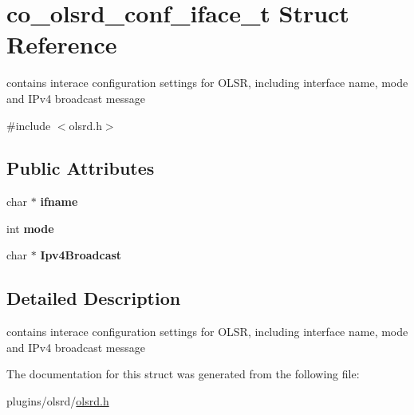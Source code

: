 \hypertarget{structco__olsrd__conf__iface__t}{\section{co\-\_\-olsrd\-\_\-conf\-\_\-iface\-\_\-t Struct Reference}
\label{structco__olsrd__conf__iface__t}
}


contains interace configuration settings for O\-L\-S\-R, including interface name, mode and I\-Pv4 broadcast message  




{\ttfamily \#include $<$olsrd.\-h$>$}

\subsection*{Public Attributes}
\begin{DoxyCompactItemize}
\item 
\hypertarget{structco__olsrd__conf__iface__t_aecf916b03bd929f233bebfdc929464f6}{char $\ast$ {\bfseries ifname}}\label{structco__olsrd__conf__iface__t_aecf916b03bd929f233bebfdc929464f6}

\item 
\hypertarget{structco__olsrd__conf__iface__t_ae627b089d737158dff982be7bd459f8a}{int {\bfseries mode}}\label{structco__olsrd__conf__iface__t_ae627b089d737158dff982be7bd459f8a}

\item 
\hypertarget{structco__olsrd__conf__iface__t_ac21895ab67b73a882cb77595409fdec2}{char $\ast$ {\bfseries Ipv4\-Broadcast}}\label{structco__olsrd__conf__iface__t_ac21895ab67b73a882cb77595409fdec2}

\end{DoxyCompactItemize}


\subsection{Detailed Description}
contains interace configuration settings for O\-L\-S\-R, including interface name, mode and I\-Pv4 broadcast message 

The documentation for this struct was generated from the following file\-:\begin{DoxyCompactItemize}
\item 
plugins/olsrd/\hyperlink{olsrd_8h}{olsrd.\-h}\end{DoxyCompactItemize}
